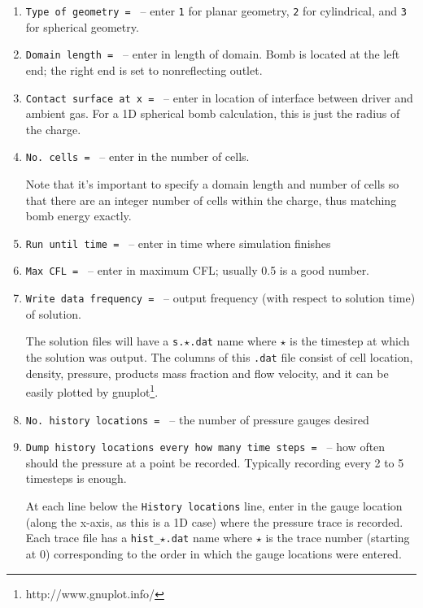 \documentclass[pdftex, 12pt, a4paper]{report}
\begin{document}
\begin{enumerate}

\item \verb'Type of geometry = ' -- enter \verb'1' for planar geometry, \verb'2' for cylindrical, and \verb'3' for spherical geometry.

\item \verb'Domain length = ' -- enter in length of domain.  Bomb is located at the left end; the right end is set to nonreflecting
  outlet.

\item \verb'Contact surface at x = ' -- enter in location of interface between driver and ambient gas.  For a 1D spherical 
  bomb calculation, this is just the radius of the charge.

\item \verb'No. cells = ' -- enter in the number of cells.  

  Note that it's important to specify a domain length and number of cells so that there are an integer number of cells within
  the charge, thus matching bomb energy exactly.

\item \verb'Run until time = ' -- enter in time where simulation finishes

\item \verb'Max CFL = ' -- enter in maximum CFL; usually 0.5 is a good number.

\item \verb'Write data frequency = ' -- output frequency (with respect to solution time) of solution.

  The solution files will have a \verb's.'$\star$\verb'.dat' name where $\star$ is the timestep at which the solution was output.
  The columns of this \verb'.dat' file consist of cell location, density, pressure, products mass fraction and flow velocity,
  and it can be easily plotted by gnuplot\footnote{http://www.gnuplot.info/}.

\item \verb'No. history locations = ' -- the number of pressure gauges desired

\item \verb'Dump history locations every how many time steps = ' -- how often should the pressure at a point be recorded.  Typically recording every 2 to 5 timesteps is enough.

At each line below the \verb'History locations' line, enter in the gauge location (along the x-axis, as this is a 1D case) where
the pressure trace is recorded.  Each trace file has a \verb'hist_'$\star$\verb'.dat' name where $\star$ is the
trace number (starting at 0) corresponding to the order in which the gauge locations were entered.

\end{enumerate}
\end{document}
